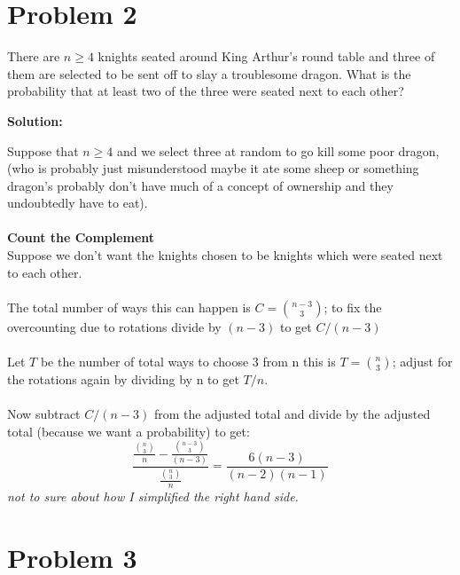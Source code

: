 \documentclass{article}
\begin{document}
\section*{Problem 2}
    There are $n\geq4$ knights seated around King Arthur's round table and three of them are selected to be sent off to slay a troublesome dragon. What is the probability that at least two of the three were seated next to each other?
    \bigskip
    
    \textbf{Solution:}
    \bigskip
    
    Suppose that $n \geq 4$ and we select three at random to go kill some poor dragon, (who is probably just misunderstood maybe it ate some sheep or something dragon's probably don't have much of a concept of ownership and they undoubtedly have to eat). 
    \\ \\
    \textbf{Count the Complement}
    \\ 
    Suppose we don't want the knights chosen to be knights which were seated next to each other.
    \\ \\
    The total number of ways this can happen is $C = \binom{n-3}{3}$; to fix the overcounting due to rotations divide by $(n-3)$ to get $C/(n-3)$
    \\ \\
    Let $T$ be the number of total ways to choose 3 from n this is $T = \binom{n}{3}$; adjust for the rotations again by dividing by n to get $T/n$.
    \\ \\
    Now subtract $C/(n-3)$ from the adjusted total and divide by the adjusted total (because we want a probability) to get:
    $$\frac{\frac{\binom{n}{3}}{n} - \frac{\binom{n-3}{3}}{(n-3)}}{\frac{\binom{n}{3}}{n}}= \frac{6(n-3)}{(n-2)(n-1)}$$
    \bigskip
    \textit{not to sure about how I simplified the right hand side.}
 
\section*{Problem 3}
\end{document}

